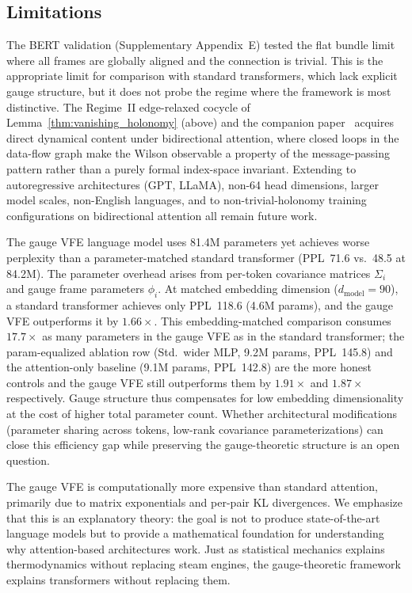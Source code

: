\documentclass[twoside,11pt]{article}
\begin{document}
\subsection{Limitations}

The BERT validation (Supplementary Appendix~E) tested the flat bundle limit where all frames are globally aligned and the connection is trivial. This is the appropriate limit for comparison with standard transformers, which lack explicit gauge structure, but it does not probe the regime where the framework is most distinctive. The Regime~II edge-relaxed cocycle of Lemma~\ref{thm:vanishing_holonomy} (above) and the companion paper~\cite{Dennis2025it} acquires direct dynamical content under bidirectional attention, where closed loops in the data-flow graph make the Wilson observable a property of the message-passing pattern rather than a purely formal index-space invariant. Extending to autoregressive architectures (GPT, LLaMA), non-64 head dimensions, larger model scales, non-English languages, and to non-trivial-holonomy training configurations on bidirectional attention all remain future work.

The gauge VFE language model uses 81.4M parameters yet achieves worse perplexity than a parameter-matched standard transformer (PPL~71.6 vs.\ 48.5 at 84.2M). The parameter overhead arises from per-token covariance matrices $\Sigma_i$ and gauge frame parameters $\phi_i$. At matched embedding dimension ($d_{\text{model}} = 90$), a standard transformer achieves only PPL~118.6 (4.6M params), and the gauge VFE outperforms it by $1.66\times$. This embedding-matched comparison consumes $17.7\times$ as many parameters in the gauge VFE as in the standard transformer; the param-equalized ablation row (Std.\ wider MLP, 9.2M params, PPL~145.8) and the attention-only baseline (9.1M params, PPL~142.8) are the more honest controls and the gauge VFE still outperforms them by $1.91\times$ and $1.87\times$ respectively. Gauge structure thus compensates for low embedding dimensionality at the cost of higher total parameter count. Whether architectural modifications (parameter sharing across tokens, low-rank covariance parameterizations) can close this efficiency gap while preserving the gauge-theoretic structure is an open question.

The gauge VFE is computationally more expensive than standard attention, primarily due to matrix exponentials and per-pair KL divergences. We emphasize that this is an explanatory theory: the goal is not to produce state-of-the-art language models but to provide a mathematical foundation for understanding why attention-based architectures work. Just as statistical mechanics explains thermodynamics without replacing steam engines, the gauge-theoretic framework explains transformers without replacing them.
\end{document}
